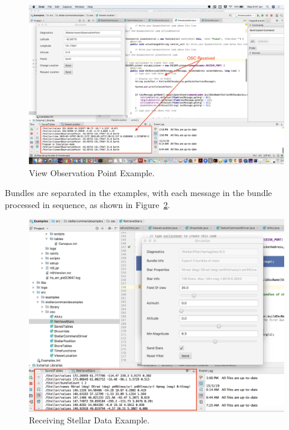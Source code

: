 \begin{figure}[htbp]
	\centering
	\includegraphics[width=1\columnwidth]{oscExampleReceive}
	\caption{View Observation Point Example.}
	\label{fig:oscExampleReceive}
\end{figure}

Bundles are separated in the examples, with each message in the bundle processed in sequence, as shown in Figure~\ref{fig:exampleStellar}.

\begin{figure}[htbp]
	\centering
	\includegraphics[width=1\columnwidth]{exampleStellar}
	\caption{Receiving Stellar Data Example.}
	\label{fig:exampleStellar}
\end{figure}


